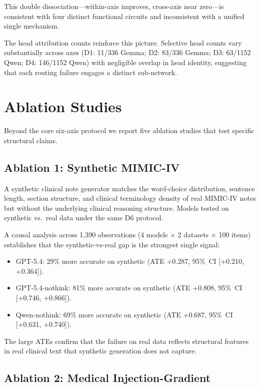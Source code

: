\documentclass[11pt]{article}
\begin{document}
This double dissociation---within-axis improves, cross-axis near
zero---is consistent with four distinct functional circuits and
inconsistent with a unified single mechanism.

The head attribution counts reinforce this picture. Selective head counts
vary substantially across axes (D1: 11/336 Gemma; D2: 83/336 Gemma;
D3: 63/1152 Qwen; D4: 146/1152 Qwen) with negligible overlap in head
identity, suggesting that each routing failure engages a distinct
sub-network.

\section{Ablation Studies}
\label{sec:ablations}

Beyond the core six-axis protocol we report five ablation studies that
test specific structural claims.

\subsection{Ablation 1: Synthetic MIMIC-IV}

A synthetic clinical note generator matches the word-choice distribution,
sentence length, section structure, and clinical terminology density of
real MIMIC-IV notes but without the underlying clinical reasoning
structure. Models tested on synthetic vs.\ real data under the same D6
protocol.

A causal analysis across 1,390 observations (4 models $\times$ 2
datasets $\times$ 100 items) establishes that the synthetic-vs-real gap
is the strongest single signal:
\begin{itemize}[noitemsep, topsep=2pt]
\item GPT-5.4: 29\% more accurate on synthetic (ATE +0.287, 95\%~CI
[+0.210, +0.364]).
\item GPT-5.4-nothink: 81\% more accurate on synthetic (ATE +0.808,
95\%~CI [+0.746, +0.866]).
\item Qwen-nothink: 69\% more accurate on synthetic (ATE +0.687,
95\%~CI [+0.631, +0.740]).
\end{itemize}
The large ATEs confirm that the failure on real data reflects structural
features in real clinical text that synthetic generation does not capture.

\subsection{Ablation 2: Medical Injection-Gradient}
\end{document}
